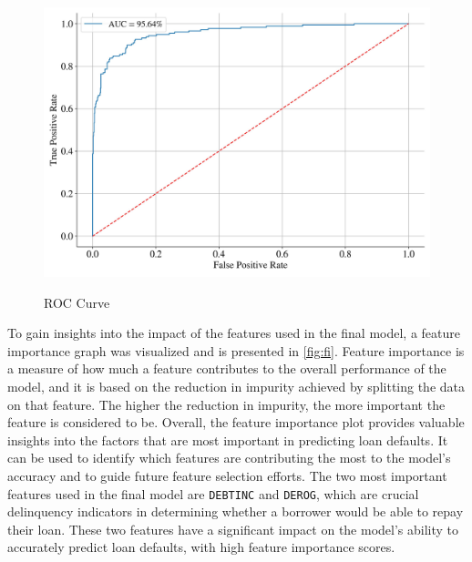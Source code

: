         \begin{figure}[H]
            \centering
            \caption{ROC Curve}\vspace{0.5em}
            \label{fig:roc}\
            \includegraphics[width=140mm]{Figures/ROC_curve_FINAL.jpg}
        
            \vspace{-1em}
        \end{figure}
        To gain insights into the impact of the features used in the final model, a feature importance graph was visualized and is presented in \autoref{fig:fi}.
        Feature importance is a measure of how much a feature contributes to the overall performance of the model, and it is based on the reduction in impurity achieved by splitting the data on that feature.
        The higher the reduction in impurity, the more important the feature is considered to be.
        Overall, the feature importance plot provides valuable insights into the factors that are most important in predicting loan defaults. It can be used to identify which features are contributing the most to the model's accuracy and to guide future feature selection efforts.
        The two most important features used in the final model are \texttt{DEBTINC} and \texttt{DEROG}, which are crucial delinquency indicators in determining whether a borrower would be able to repay their loan. These two features have a significant impact on the model's ability to accurately predict loan defaults, with high feature importance scores.
        
